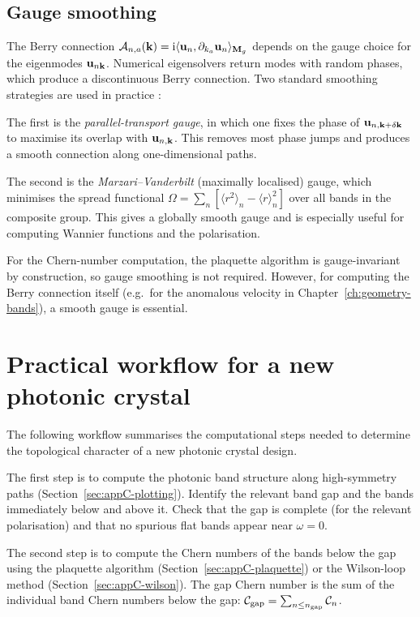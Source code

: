 \subsection{Gauge smoothing}
\label{sec:appC-gauge-smoothing}

The Berry connection $\mathcal{A}_{n,a}(\mathbf{k})
=\mathrm{i}\langle \mathbf{u}_n , \partial_{k_a}\mathbf{u}_n \rangle_{\mathbf{M}_g}$ depends on the
gauge choice for the eigenmodes $\mathbf{u}_{n\mathbf{k}}$.  Numerical
eigensolvers return modes with random phases, which produce a
discontinuous Berry connection.  Two standard smoothing strategies are
used in practice \cite{price2022roadmap}:

The first is the \emph{parallel-transport gauge}, in which one fixes
the phase of $\mathbf{u}_{n,\mathbf{k}+\delta\mathbf{k}}$ to maximise its
overlap with $\mathbf{u}_{n,\mathbf{k}}$.  This removes most phase jumps
and produces a smooth connection along one-dimensional paths.

The second is the \emph{Marzari--Vanderbilt} (maximally localised)
gauge, which minimises the spread functional
$\Omega=\sum_n[\langle r^2\rangle_n-\langle r\rangle_n^2]$ over all
bands in the composite group.  This gives a globally smooth gauge and
is especially useful for computing Wannier functions and the
polarisation.

For the Chern-number computation, the plaquette algorithm is
gauge-invariant by construction, so gauge smoothing is not required.
However, for computing the Berry connection itself (e.g.\ for the
anomalous velocity in Chapter~\ref{ch:geometry-bands}), a smooth gauge
is essential.

\section{Practical workflow for a new photonic crystal}
\label{sec:appC-workflow}

The following workflow summarises the computational steps needed to
determine the topological character of a new photonic crystal design.

The first step is to compute the photonic band structure along
high-symmetry paths (Section~\ref{sec:appC-plotting}).  Identify the
relevant band gap and the bands immediately below and above it.  Check
that the gap is complete (for the relevant polarisation) and that no
spurious flat bands appear near $\omega=0$.

The second step is to compute the Chern numbers of the bands below the
gap using the plaquette algorithm (Section~\ref{sec:appC-plaquette})
or the Wilson-loop method (Section~\ref{sec:appC-wilson}).  The gap
Chern number is the sum of the individual band Chern numbers below the
gap: $\mathcal{C}_{\mathrm{gap}}=\sum_{n\leq n_{\mathrm{gap}}}\mathcal{C}_n$.

